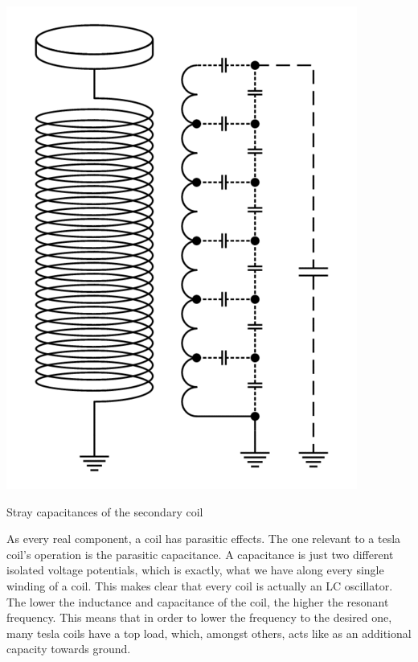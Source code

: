 \begin{marginfigure}[*-5]
\includegraphics[width=\textwidth]{simon/resources/teslaCoilStrayCapacitance.png}
\caption{Stray capacitances of the secondary coil}
\end{marginfigure}

As every real component, a coil has parasitic effects. The one relevant to a tesla coil's operation is the parasitic capacitance. A capacitance is just two different isolated voltage potentials, which is exactly, what we have along every single winding of a coil. This makes clear that every coil is actually an LC oscillator. The lower the inductance and capacitance of the coil, the higher the resonant frequency. This means that in order to lower the frequency to the desired one, many tesla coils have a top load, which, amongst others, acts like as an additional capacity towards ground.

